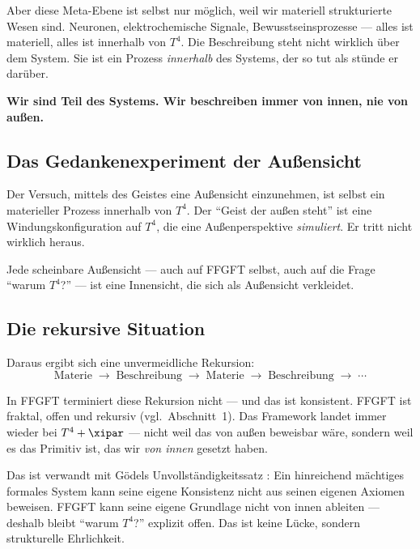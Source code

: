 Aber diese Meta-Ebene ist selbst nur möglich, weil wir materiell strukturierte Wesen sind. Neuronen, elektrochemische Signale, Bewusstseinsprozesse --- alles ist materiell, alles ist innerhalb von $T^4$. Die Beschreibung steht nicht wirklich über dem System. Sie ist ein Prozess \emph{innerhalb} des Systems, der so tut als stünde er darüber.

\begin{erkenntnis}
\textbf{Wir sind Teil des Systems. Wir beschreiben immer von innen, nie von außen.}
\end{erkenntnis}

\subsection{Das Gedankenexperiment der Außensicht}

Der Versuch, mittels des Geistes eine Außensicht einzunehmen, ist selbst ein materieller Prozess innerhalb von $T^4$. Der ``Geist der außen steht'' ist eine Windungskonfiguration auf $T^4$, die eine Außenperspektive \emph{simuliert}. Er tritt nicht wirklich heraus.

Jede scheinbare Außensicht --- auch auf FFGFT selbst, auch auf die Frage ``warum $T^4$?'' --- ist eine Innensicht, die sich als Außensicht verkleidet.

\subsection{Die rekursive Situation}

Daraus ergibt sich eine unvermeidliche Rekursion:
\begin{equation}
  \text{Materie} \;\rightarrow\; \text{Beschreibung} \;\rightarrow\; \text{Materie} \;\rightarrow\; \text{Beschreibung} \;\rightarrow\; \cdots
\end{equation}

In FFGFT terminiert diese Rekursion nicht --- und das ist konsistent. FFGFT ist fraktal, offen und rekursiv (vgl.\ Abschnitt~1). Das Framework landet immer wieder bei $T^4 + \xipar$ --- nicht weil das von außen beweisbar wäre, sondern weil es das Primitiv ist, das wir \emph{von innen} gesetzt haben.

\begin{keyresult}
Das ist verwandt mit Gödels Unvollständigkeitssatz \cite{Goedel1931}: Ein hinreichend mächtiges formales System kann seine eigene Konsistenz nicht aus seinen eigenen Axiomen beweisen. FFGFT kann seine eigene Grundlage nicht von innen ableiten --- deshalb bleibt ``warum $T^4$?'' explizit offen. Das ist keine Lücke, sondern strukturelle Ehrlichkeit.
\end{keyresult}

